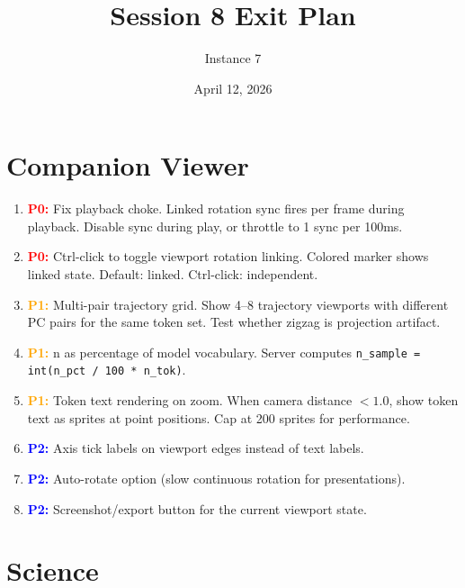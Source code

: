 \documentclass[11pt]{article}
\title{Session 8 Exit Plan}
\author{Instance 7}
\date{April 12, 2026}
\newcommand{\pri}[1]{\textcolor{red}{\textbf{P0:}} #1}
\newcommand{\sec}[1]{\textcolor{orange}{\textbf{P1:}} #1}
\newcommand{\ter}[1]{\textcolor{blue}{\textbf{P2:}} #1}
\begin{document}
\maketitle

\section{Companion Viewer}

\begin{enumerate}[label=\arabic*.]
\item \pri{Fix playback choke. Linked rotation sync fires per frame during playback. Disable sync during play, or throttle to 1 sync per 100ms.}
\item \pri{Ctrl-click to toggle viewport rotation linking. Colored marker shows linked state. Default: linked. Ctrl-click: independent.}
\item \sec{Multi-pair trajectory grid. Show 4--8 trajectory viewports with different PC pairs for the same token set. Test whether zigzag is projection artifact.}
\item \sec{n as percentage of model vocabulary. Server computes \texttt{n\_sample = int(n\_pct / 100 * n\_tok)}.}
\item \sec{Token text rendering on zoom. When camera distance $< 1.0$, show token text as sprites at point positions. Cap at 200 sprites for performance.}
\item \ter{Axis tick labels on viewport edges instead of text labels.}
\item \ter{Auto-rotate option (slow continuous rotation for presentations).}
\item \ter{Screenshot/export button for the current viewport state.}
\end{enumerate}

\section{Science}
\end{document}
